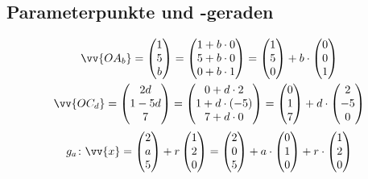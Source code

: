 \subsection{Parameterpunkte und -geraden}
\begin{gather*}
  \vv{OA_b} = \begin{pmatrix}1 \\ 5 \\ b\end{pmatrix} = \begin{pmatrix}1 + b \cdot 0 \\ 5 + b \cdot 0 \\ 0 + b \cdot 1\end{pmatrix} = \begin{pmatrix}1 \\ 5 \\ 0\end{pmatrix} + b \cdot \begin{pmatrix}0 \\ 0 \\ 1\end{pmatrix} \\
  \vv{OC_d} = \begin{pmatrix}2d \\ 1 - 5d \\ 7\end{pmatrix} = \begin{pmatrix}0 + d \cdot 2 \\ 1 + d \cdot (-5) \\ 7 + d \cdot 0\end{pmatrix} = \begin{pmatrix}0 \\ 1 \\ 7\end{pmatrix} + d \cdot \begin{pmatrix}2 \\ -5 \\ 0\end{pmatrix}
\end{gather*}
\begin{gather*}
  g_a \colon \vv{x} = \begin{pmatrix}2 \\ a \\ 5\end{pmatrix} + r \begin{pmatrix}1 \\ 2 \\ 0\end{pmatrix} = \begin{pmatrix}2 \\ 0 \\ 5\end{pmatrix} + a \cdot \begin{pmatrix}0 \\ 1 \\ 0\end{pmatrix} + r \cdot \begin{pmatrix}1 \\ 2 \\ 0\end{pmatrix}
\end{gather*}
